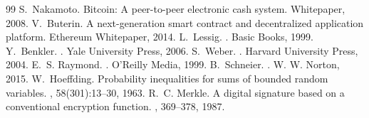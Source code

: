 \documentclass[12pt,a4paper]{article}
\theoremstyle{definition}
\begin{document}
\begin{thebibliography}{99}
S.~Nakamoto.
\newblock Bitcoin: A peer-to-peer electronic cash system.
\newblock Whitepaper, 2008.
V.~Buterin.
\newblock A next-generation smart contract and decentralized application platform.
\newblock Ethereum Whitepaper, 2014.
L.~Lessig.
.
\newblock Basic Books, 1999.
Y.~Benkler.
.
\newblock Yale University Press, 2006.
S.~Weber.
.
\newblock Harvard University Press, 2004.
E.~S. Raymond.
.
\newblock O'Reilly Media, 1999.
B.~Schneier.
.
\newblock W. W. Norton, 2015.
W.~Hoeffding.
\newblock Probability inequalities for sums of bounded random variables.
, 58(301):13--30, 1963.
R.~C. Merkle.
\newblock A digital signature based on a conventional encryption function.
, 369--378, 1987.
\end{thebibliography}
\end{document}
